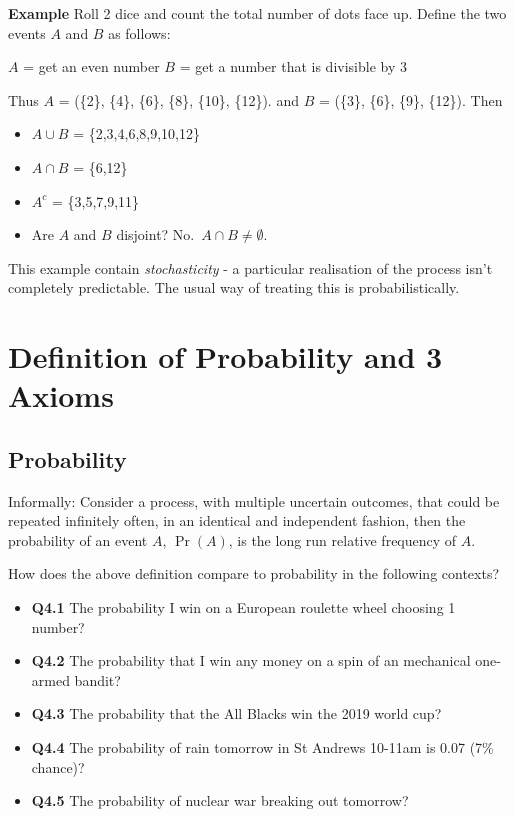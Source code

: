 \documentclass[
  oneside]{krantz}
\providecommand{\tightlist}{%
  \setlength{\itemsep}{0pt}\setlength{\parskip}{0pt}}
\begin{document}
\textbf{Example} Roll 2 dice and count the total number of dots face up. Define the two events \(A\) and \(B\) as follows:

\(A\) = get an even number
\(B\) = get a number that is divisible by 3

Thus \(A\) = (\{2\}, \{4\}, \{6\}, \{8\}, \{10\}, \{12\}). and \(B\) = (\{3\}, \{6\}, \{9\}, \{12\}). Then

\begin{itemize}
\tightlist
\item
  \(A \cup B\) = \{2,3,4,6,8,9,10,12\}
\item
  \(A \cap B\) = \{6,12\}
\item
  \(A^c\) = \{3,5,7,9,11\}
\item
  Are \(A\) and \(B\) disjoint? No.~\(A \cap B \ne \emptyset\).
\end{itemize}

This example contain \emph{stochasticity} - a particular realisation of the process isn't completely predictable. The usual way of treating this is probabilistically.

\hypertarget{definition-of-probability-and-3-axioms}{%
\section{Definition of Probability and 3 Axioms}\label{definition-of-probability-and-3-axioms}}

\hypertarget{probability-1}{%
\subsection{Probability}\label{probability-1}}

Informally: Consider a process, with multiple uncertain outcomes, that could be repeated infinitely often, in an identical and independent fashion, then the probability of an event \(A\), \(\Pr(A)\), is the long run relative frequency of \(A\).

How does the above definition compare to probability in the following contexts?

\begin{itemize}
\tightlist
\item
  \textbf{Q4.1} The probability I win on a European roulette wheel choosing 1 number?
\item
  \textbf{Q4.2} The probability that I win any money on a spin of an mechanical one-armed bandit?
\item
  \textbf{Q4.3} The probability that the All Blacks win the 2019 world cup?
\item
  \textbf{Q4.4} The probability of rain tomorrow in St Andrews 10-11am is 0.07 (7\% chance)?
\item
  \textbf{Q4.5} The probability of nuclear war breaking out tomorrow?
\end{itemize}
\end{document}
